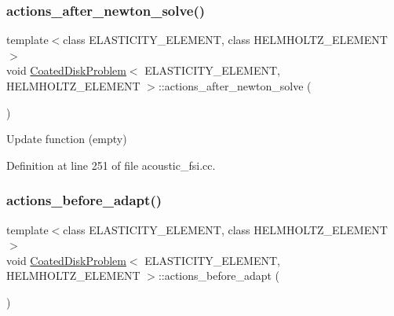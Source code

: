 \subsubsection{\texorpdfstring{actions\+\_\+after\+\_\+newton\+\_\+solve()}{actions\_after\_newton\_solve()}\hspace{0.1cm}{\footnotesize\ttfamily [2/2]}}
{\footnotesize\ttfamily template$<$class E\+L\+A\+S\+T\+I\+C\+I\+T\+Y\+\_\+\+E\+L\+E\+M\+E\+NT, class H\+E\+L\+M\+H\+O\+L\+T\+Z\+\_\+\+E\+L\+E\+M\+E\+NT$>$ \\
void \hyperlink{classCoatedDiskProblem}{Coated\+Disk\+Problem}$<$ E\+L\+A\+S\+T\+I\+C\+I\+T\+Y\+\_\+\+E\+L\+E\+M\+E\+NT, H\+E\+L\+M\+H\+O\+L\+T\+Z\+\_\+\+E\+L\+E\+M\+E\+NT $>$\+::actions\+\_\+after\+\_\+newton\+\_\+solve (\begin{DoxyParamCaption}{ }\end{DoxyParamCaption})\hspace{0.3cm}{\ttfamily [inline]}}



Update function (empty) 



Definition at line 251 of file acoustic\+\_\+fsi.\+cc.

\mbox{\label{classCoatedDiskProblem_a89e972df172b024b1358f0fac7646d6d}} 
\subsubsection{\texorpdfstring{actions\+\_\+before\+\_\+adapt()}{actions\_before\_adapt()}\hspace{0.1cm}{\footnotesize\ttfamily [1/2]}}
{\footnotesize\ttfamily template$<$class E\+L\+A\+S\+T\+I\+C\+I\+T\+Y\+\_\+\+E\+L\+E\+M\+E\+NT, class H\+E\+L\+M\+H\+O\+L\+T\+Z\+\_\+\+E\+L\+E\+M\+E\+NT$>$ \\
void \hyperlink{classCoatedDiskProblem}{Coated\+Disk\+Problem}$<$ E\+L\+A\+S\+T\+I\+C\+I\+T\+Y\+\_\+\+E\+L\+E\+M\+E\+NT, H\+E\+L\+M\+H\+O\+L\+T\+Z\+\_\+\+E\+L\+E\+M\+E\+NT $>$\+::actions\+\_\+before\+\_\+adapt (\begin{DoxyParamCaption}{ }\end{DoxyParamCaption})}



